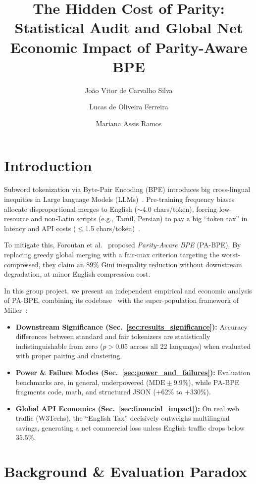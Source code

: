 \documentclass[sigconf,nonacm]{acmart}
\title{The Hidden Cost of Parity: Statistical Audit and Global Net Economic Impact of Parity-Aware BPE}
\author{João Vitor de Carvalho Silva}
\affiliation{}
\author{Lucas de Oliveira Ferreira}
\affiliation{}
\author{Mariana Assis Ramos}
\affiliation{}
\begin{document}
\maketitle

\section{Introduction}
\label{sec:intro}

Subword tokenization via Byte-Pair Encoding (BPE) introduces big cross-lingual inequities in Large language Models (LLMs)~\cite{petrov2023language,ahia2023all}. Pre-training frequency biases allocate disproportional merges to English ($\sim$4.0 chars/token), forcing low-resource and non-Latin scripts (e.g., Tamil, Persian) to pay a big ``token tax'' in latency and API costs ($\le$1.5 chars/token)~\cite{ahia2023all,nllb2022no}.

To mitigate this, Foroutan et al.~\cite{foroutan2026parity} proposed \textit{Parity-Aware BPE} (PA-BPE). By replacing greedy global merging with a fair-max criterion targeting the worst-compressed, they claim an $89\%$ Gini inequality reduction without downstream degradation, at minor English compression cost.

In this group project, we present an independent empirical and economic analysis of PA-BPE, combining its codebase~\cite{foroutan2026parity} with the super-population framework of Miller~\cite{miller2024adding}:
\begin{itemize}
    \item \textbf{Downstream Significance (Sec.~\ref{sec:results_significance}):} Accuracy differences between standard and fair tokenizers are statistically indistinguishable from zero ($p > 0.05$ across all 22 languages) when evaluated with proper pairing and clustering.
    \item \textbf{Power \& Failure Modes (Sec.~\ref{sec:power_and_failures}):} Evaluation benchmarks are, in general, underpowered ($\mathrm{MDE} \pm 9.9\%$), while PA-BPE fragments code, math, and structured JSON ($+62\%$ to $+330\%$).
    \item \textbf{Global API Economics (Sec.~\ref{sec:financial_impact}):} On real web traffic (W3Techs), the ``English Tax'' decisively outweighs multilingual savings, generating a net commercial loss unless English traffic drops below $35.5\%$.
\end{itemize}

\section{Background \& Evaluation Paradox}
\label{sec:background}
\end{document}

